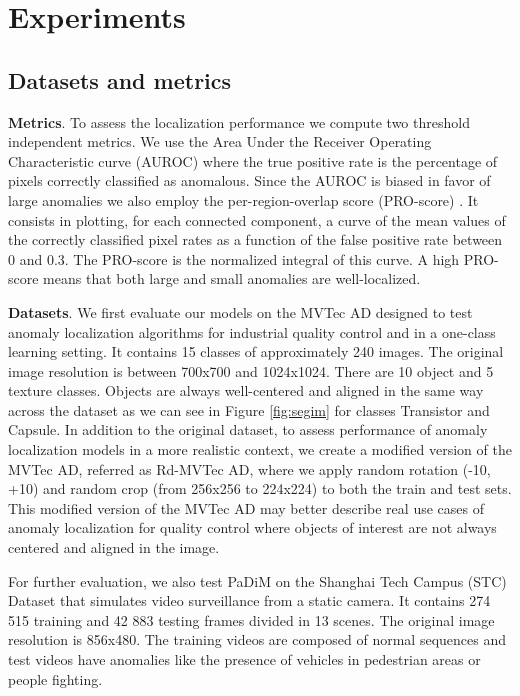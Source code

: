 \documentclass[a4paper,conference]{IEEEtran}
\begin{document}
\section{Experiments}


\subsection{Datasets and  metrics}
\label{Dataset, metrics and experimental setup}

\textbf{Metrics}. To assess the localization performance we compute two threshold independent metrics. We use the Area Under the Receiver Operating Characteristic curve (AUROC) where the true positive rate is the percentage of pixels correctly classified as anomalous. Since the AUROC is biased in favor of large anomalies we also employ the per-region-overlap score (PRO-score) \cite{bergmann2019uninformed}. It consists in plotting, for each connected component, a curve of the mean values of the correctly classified pixel rates as a function of the false positive rate between 0 and 0.3. The PRO-score is the normalized integral of this curve. A high PRO-score means that both large and small anomalies are well-localized.


\textbf{Datasets}. We first evaluate our models on the MVTec AD \cite{bergmann2019mvtec} designed to test anomaly localization algorithms for industrial quality control and in a one-class learning setting. It contains 15 classes of approximately 240 images. The original image resolution is between 700x700 and 1024x1024. There are 10 object and 5 texture classes. Objects are always well-centered and aligned in the same way across the dataset as we can see in Figure \ref{fig:segim} for classes Transistor and Capsule. In addition to the original dataset, to assess performance of anomaly localization models in a more realistic context, we create a modified version of the MVTec AD, referred as  Rd-MVTec AD, where we apply random  rotation  (-10,  +10)  and  random  crop  (from  256x256 to 224x224) to both the train and test sets. This modified version of the MVTec AD may better describe  real  use  cases  of  anomaly  localization  for  quality control  where  objects  of  interest  are not always centered  and aligned in the image. 

For further evaluation, we also test PaDiM on the Shanghai Tech Campus (STC) Dataset \cite{liu2018ano_pred} that simulates video surveillance from a static camera. It contains 274 515 training and 42 883 testing frames divided in 13 scenes. The original image resolution is 856x480. The training  videos are composed of normal sequences and test videos have anomalies like the presence of vehicles in pedestrian areas or people fighting. 
\end{document}
